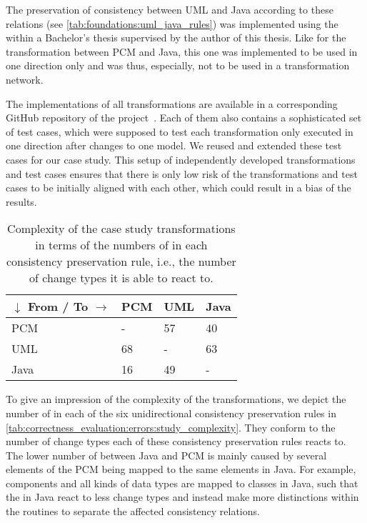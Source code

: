 The preservation of consistency between \gls{UML} and Java according to these relations (see \autoref{tab:foundations:uml_java_rules}) was implemented using the \reactionslanguage within a Bachelor's thesis supervised by the author of this thesis.
Like for the transformation between \gls{PCM} and Java, this one was implemented to be used in one direction only and was thus, especially, not to be used in a transformation network.

The implementations of all transformations are available in a corresponding GitHub repository of the \vitruv project~\cite{vitruvCBSEGithub}.
Each of them also contains a sophisticated set of test cases, which were supposed to test each transformation only executed in one direction after changes to one model.
We reused and extended these test cases for our case study.
This setup of independently developed transformations and test cases ensures that there is only low risk of the transformations and test cases to be initially aligned with each other, which could result in a bias of the results.

\begin{table}
    \centering
    \small
    \renewcommand{\arraystretch}{1.4}
    \begin{tabular}{L{7em}C{4em}C{4em}C{4em}}
        \toprule
        \textbf{$\downarrow$ From} / \textbf{To $\rightarrow$}& \gls{PCM} & \gls{UML} & Java \\
        \midrule
        \gls{PCM} & -   & 57    & 40 \\
        \gls{UML} & 68  & -     & 63 \\
        Java      & 16  & 49    & -  \\
        \bottomrule
    \end{tabular}
    \caption[Complexity of case study transformations]{Complexity of the case study transformations in terms of the numbers of \reactions in each consistency preservation rule, i.e., the number of change types it is able to react to.}
    \label{tab:correctness_evaluation:errors:study_complexity}
\end{table}

To give an impression of the complexity of the transformations, we depict the number of \reactions in each of the six unidirectional consistency preservation rules in \autoref{tab:correctness_evaluation:errors:study_complexity}.
They conform to the number of change types each of these consistency preservation rules reacts to.
The lower number of \reactions between Java and \gls{PCM} is mainly caused by several elements of the \gls{PCM} being mapped to the same elements in Java.
For example, components and all kinds of data types are mapped to classes in Java, such that the \reactions in Java react to less change types and instead make more distinctions within the routines to separate the affected consistency relations.


